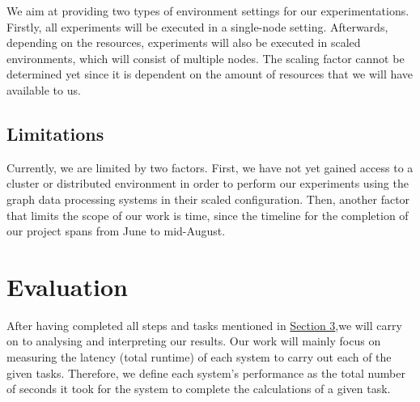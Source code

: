 \documentclass[a4paper,11pt]{article}
\begin{document}
\par We aim at providing two types of environment settings for our experimentations. Firstly, all experiments will be executed in a single-node setting. Afterwards, depending on the resources, experiments will also be executed in scaled environments, which will consist of multiple nodes. The scaling factor cannot be determined yet since it is dependent on the amount of resources that we will have available to us.

\subsection{Limitations} \label{limitations}

Currently, we are limited by two factors. First, we have not yet gained access to a cluster or distributed environment in order to perform our experiments using the graph data processing systems in their scaled configuration. Then, another factor that limits the scope of our work is time, since the timeline for the completion of our project spans from June to mid-August.


\section{Evaluation} \label{evaluation}

\par After having completed all steps and tasks mentioned in \hyperref[methodology]{Section 3},we will carry on to analysing and interpreting our results. Our work will mainly focus on measuring the latency (total runtime) of each system to carry out each of the given tasks. Therefore, we define each system's performance as the total number of seconds it took for the system to complete the calculations of a given task.
\end{document}
